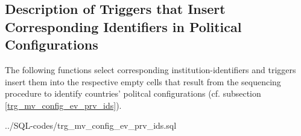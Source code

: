 \subsection{Description of Triggers that Insert Corresponding Identifiers in Political Configurations}\label{appx_trg_mv_config_ev_prv_ids}
The following functions select corresponding institution-identifiers and triggers insert them into the respective empty cells that result from the sequencing procedure to identify countries' politcal configurations (cf. subsection \ref{trg_mv_config_ev_prv_ids}).

%
{../SQL-codes/trg_mv_config_ev_prv_ids.sql}
